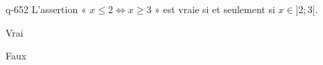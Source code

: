 \begin{truefalse}{q-652}
L'assertion « $x\leq 2 \Leftrightarrow x \geq 3$ » est vraie si et seulement si $x\in ]2;3[$.
\item* Vrai
\item Faux
\end{truefalse}

